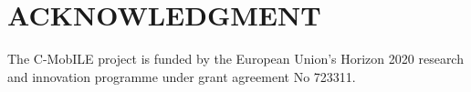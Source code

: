 \documentclass[letterpaper, 10 pt, conference]{ieeeconf}  %
\begin{document}
\addtolength{\textheight}{-12cm}   %




\section*{ACKNOWLEDGMENT}

The C-MobILE project is funded by the European Union's Horizon 2020 research and innovation programme under grant agreement No 723311.


\end{document}
